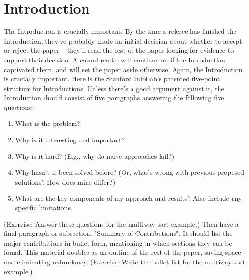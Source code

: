 \section{Introduction}

The Introduction is crucially important. By the time a referee has finished the Introduction, they've probably made an initial decision about whether to accept or reject the paper -- they'll read the rest of the paper looking for evidence to support their decision. A casual reader will continue on if the Introduction captivated them, and will set the paper aside otherwise. Again, the Introduction is crucially important.
Here is the Stanford InfoLab's patented five-point structure for Introductions. Unless there's a good argument against it, the Introduction should consist of five paragraphs answering the following five questions:

\begin{enumerate}
\item What is the problem?
\item Why is it interesting and important?
\item Why is it hard? (E.g., why do naive approaches fail?)
\item Why hasn't it been solved before? (Or, what's wrong with previous proposed solutions? How does mine differ?)
\item What are the key components of my approach and results? Also include any specific limitations.
\end{enumerate}

(Exercise: Answer these questions for the multiway sort example.)
Then have a final paragraph or subsection: "Summary of Contributions". It should list the major contributions in bullet form, mentioning in which sections they can be found. This material doubles as an outline of the rest of the paper, saving space and eliminating redundancy.
(Exercise: Write the bullet list for the multiway sort example.)
